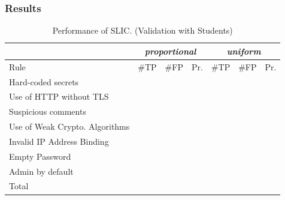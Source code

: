 \subsubsection{Results}

\begin{table}[t]
  \small
  \centering
  \setlength{\tabcolsep}{3.5pt}
  \caption{\label{tab:prel_analysis_slic}Performance of SLIC. (Validation with Students)}
  \vspace{-2ex}
  \begin{tabular}{lrrrrrr} 
    \toprule
    \cellcolor{Gray} \textbf{\slic{}} & \multicolumn{3}{c}{\textit{proportional}} & \multicolumn{3}{c}{\textit{uniform}} \\\midrule
    Rule & \#TP & \#FP & Pr. &  \#TP & \#FP & Pr. \\
    \midrule
    Hard-coded secrets & \tpHardcodedSecretsProportional{} & \fpHardcodedSecretsProportional{} & \precHardcodedSecretsProportional{} & \tpHardcodedSecretsUniform{} & \fpHardcodedSecretsUniform{} & \precHardcodedSecretsUniform{} \\
    Use of HTTP without TLS & \tpHttpWithoutTLSProportional{} & \fpHttpWithoutTLSProportional{} & \precHttpWithoutTLSProportional{} & \tpHttpWithoutTLSUniform{} & \fpHttpWithoutTLSUniform{} & \precHttpWithoutTLSUniform{} \\
    Suspicious comments & \tpSuspiciousCommentsProportional{} & \fpSuspiciousCommentsProportional{} & \precSuspiciousCommentsProportional{} & \tpSuspiciousCommentsUniform{} & \fpSuspiciousCommentsUniform{} & \precSuspiciousCommentsUniform{} \\
    Use of Weak Crypto. Algorithms & \tpWeakCryptoProportional{} & \fpWeakCryptoProportional{} & \precWeakCryptoProportional{} & \tpWeakCryptoUniform{} & \fpWeakCryptoUniform{} & \precWeakCryptoUniform{} \\
    Invalid IP Address Binding & \tpInvalidIPProportional{} & \fpInvalidIPProportional{} & \precInvalidIPProportional{} & \tpInvalidIPUniform{} & \fpInvalidIPUniform{} & \precInvalidIPUniform{} \\
    Empty Password & \tpEmptyPassProportional{} & \fpEmptyPassProportional{} & \precEmptyPassProportional{} & \tpEmptyPassUniform{} & \fpEmptyPassUniform{} & \precEmptyPassUniform{}\\
    Admin by default & \tpAdminDefaultProportional{} & \fpAdminDefaultProportional{} & \precAdminDefaultProportional{} & \tpAdminDefaultUniform{} & \fpAdminDefaultUniform{} & \precAdminDefaultUniform{} \\
    \midrule
    Total & \tpProportionalSample{} & \fpProportionalSample{} & \precTotalProportional{} & \tpUniformSample{} & \fpUniformSample{} & \precTotalUniform{} \\
    \bottomrule 
  \end{tabular}
  \vspace{-5ex}
\end{table}


